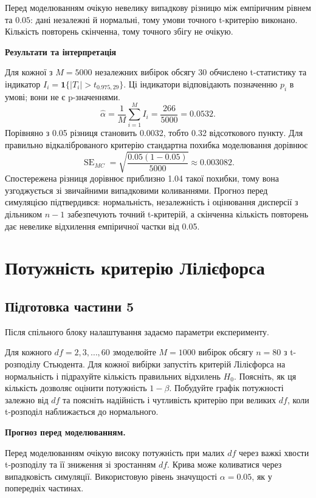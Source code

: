 \documentclass[11pt,a4paper]{article}
\newcommand{\pythoncode}[1]{%
  \Needspace{6\baselineskip}
  \begin{tcolorbox}[enhanced,breakable,colback=black!2!white,colframe=black!15!white,
    colbacktitle=black!6!white,coltitle=accent,fonttitle=\bfseries\small,
    title=Код Python,title after break={Код Python (продовження)},boxrule=0.4pt,arc=1mm,left=2mm,right=2mm,top=2mm,bottom=2mm,
    before skip=6pt,after skip=8pt]
  
  \end{tcolorbox}}
\newcommand{\answerheading}{\Needspace{4\baselineskip}\par\medskip
  {\color{answergreen}\bfseries Результати та інтерпретація}\par\smallskip}
\begin{document}
Перед моделюванням очікую невелику випадкову різницю між емпіричним рівнем та \(0.05\): дані незалежні й нормальні, тому умови точного t-критерію виконано. Кількість повторень скінченна, тому точного збігу не очікую.

\pythoncode{part4-cell7}
\answerheading
Для кожної з \(M=5000\) незалежних вибірок обсягу 30 обчислено t-статистику та індикатор \(I_i=\mathbf{1}\{|T_i|>t_{0.975,29}\}\). Ці індикатори відповідають позначенню \(p_i\) в умові; вони не є p-значеннями. \[\widehat\alpha=\frac1M\sum_{i=1}^M I_i=\frac{266}{5000}=0.0532.\] Порівняно з 0.05 різниця становить 0.0032, тобто 0.32 відсоткового пункту. Для правильно відкаліброваного критерію стандартна похибка моделювання дорівнює \[\operatorname{SE}_{MC}=\sqrt{\frac{0.05(1-0.05)}{5000}}\approx0.003082.\] Спостережена різниця дорівнює приблизно 1.04 такої похибки, тому вона узгоджується зі звичайними випадковими коливаннями. Прогноз перед симуляцією підтвердився: нормальність, незалежність і оцінювання дисперсії з дільником \(n-1\) забезпечують точний t-критерій, а скінченна кількість повторень дає невелике відхилення емпіричної частки від 0.05.

\clearpage
\section{Потужність критерію Лілієфорса}
\subsection*{Підготовка частини 5}
Після спільного блоку налаштування задаємо параметри експерименту.
\pythoncode{part5-cell2}
\begin{taskstatement}
Для кожного $df=2,3,\ldots,60$ змоделюйте $M=1000$ вибірок обсягу $n=80$ з t-розподілу Стьюдента.
Для кожної вибірки запустіть критерій Лілієфорса на нормальність і підрахуйте кількість правильних відхилень $H_0$.
Поясніть, як ця кількість дозволяє оцінити потужність $1-\beta$.
Побудуйте графік потужності залежно від $df$ та поясніть надійність і чутливість критерію при великих $df$, коли t-розподіл наближається до нормального.
\end{taskstatement}
\textbf{Прогноз перед моделюванням.}

Перед моделюванням очікую високу потужність при малих \(df\) через важкі хвости t-розподілу та її зниження зі зростанням \(df\). Крива може коливатися через випадковість симуляції. Використовую рівень значущості \(\alpha=0.05\), як у попередніх частинах.
\end{document}
